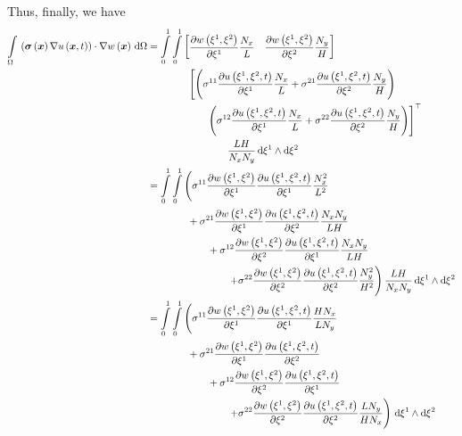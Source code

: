 Thus, finally, we have
\begin{equation}
  \begin{aligned}
    \gint{\Omega}{}{\dotprod{\pbrac{\fnof{\conductivitytensor}{\vectr{x}}\gradient{}{\fnof{u}{\vectr{x},t}}}}
      {\gradient{}{\fnof{w}{\vectr{x}}}}}{\Omega}
    &=\dintl{0}{1}\dintl{0}{1}\begin{bmatrix}
        \delby{\fnof{w}{\xione,\xitwo}}{\xione}\dfrac{N_{x}}{L}&\delby{\fnof{w}{\xione,\xitwo}}{\xitwo}\dfrac{N_{y}}{H}
    \end{bmatrix}\\
    &\qquad\qquad\left[
      \pbrac{\conductivitytensorsymbol^{11}\delby{\fnof{u}{\xione,\xitwo,t}}{\xione}\dfrac{N_{x}}{L}+
        \conductivitytensorsymbol^{21}\delby{\fnof{u}{\xione,\xitwo,t}}{\xitwo}\dfrac{N_{y}}{H}}\right. \\
      &\qquad\qquad\qquad\transpose{\left.\pbrac{\conductivitytensorsymbol^{12}\delby{\fnof{u}{\xione,\xitwo,t}}{\xione
          }\dfrac{N_{x}}{L}+
          \conductivitytensorsymbol^{22}\delby{\fnof{u}{\xione,\xitwo,t}}{\xitwo}\dfrac{N_{y}}{H}}\right]} \\    
    &\qquad\qquad\qquad\qquad\dfrac{LH}{N_{x}N_{y}}\infinitesimaltwo{\xione}{\xitwo}\\
    &=\dintl{0}{1}\dintl{0}{1}\left(\conductivitytensorsymbol^{11}\delby{\fnof{w}{\xione,\xitwo}}{\xione}
    \delby{\fnof{u}{\xione,\xitwo,t}}{\xione}\dfrac{N_{x}^{2}}{L^{2}}\right.\\
    &\qquad\qquad+\conductivitytensorsymbol^{21}\delby{\fnof{w}{\xione,\xitwo}}{\xione}
    \delby{\fnof{u}{\xione,\xitwo,t}}{\xitwo}\dfrac{N_{x}N_{y}}{L H}\\
    &\qquad\qquad\qquad+\conductivitytensorsymbol^{12} \delby{\fnof{w}{\xione,\xitwo}}{\xitwo}
    \delby{\fnof{u}{\xione,\xitwo,t}}{\xione}\dfrac{N_{x}N_{y}}{L H} \\
    &\qquad\qquad\qquad\qquad\left.+\conductivitytensorsymbol^{22}\delby{\fnof{w}{\xione,\xitwo}}{\xitwo}
    \delby{\fnof{u}{\xione,\xitwo,t}}{\xitwo}\dfrac{N_{y}^{2}}{H^{2}}\right)\dfrac{LH}{N_{x}N_{y}}
    \infinitesimaltwo{\xione}{\xitwo} \\
    &=\dintl{0}{1}\dintl{0}{1}\left(\conductivitytensorsymbol^{11}\delby{\fnof{w}{\xione,\xitwo}}{\xione}
    \delby{\fnof{u}{\xione,\xitwo,t}}{\xione}\dfrac{H N_{x}}{L N_{y}}\right.\\
    &\qquad\qquad+\conductivitytensorsymbol^{21}\delby{\fnof{w}{\xione,\xitwo}}{\xione}
    \delby{\fnof{u}{\xione,\xitwo,t}}{\xitwo}\\
    &\qquad\qquad\qquad+\conductivitytensorsymbol^{12}\delby{\fnof{w}{\xione,\xitwo}}{\xitwo}
    \delby{\fnof{u}{\xione,\xitwo,t}}{\xione}\\
    &\qquad\qquad\qquad\qquad\left.+\conductivitytensorsymbol^{22}\delby{\fnof{w}{\xione,\xitwo}}{\xitwo}
    \delby{\fnof{u}{\xione,\xitwo,t}}{\xitwo}\dfrac{L N_{y}}{H N_{x}}\right)\infinitesimaltwo{\xione}{\xitwo}
  \end{aligned}
\end{equation}

